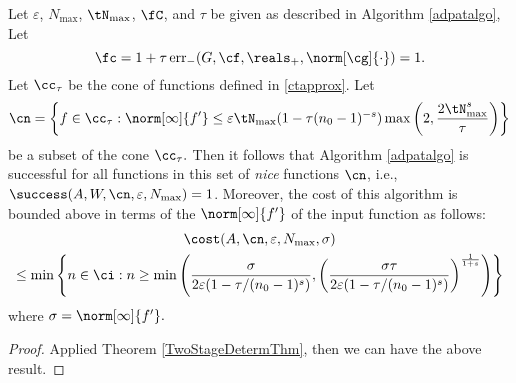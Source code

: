 \begin{theorem}   Let  $\varepsilon$, $N_{\max}$, $\tN_{\max}$, $\fC$, and $\tau$ be given as described in Algorithm \ref{adpatalgo},  Let
\begin{equation} \label{normdeflate}
\fc =1 + \tau \err_{-}(G,\cf,\reals_+,\norm[\cg]{\cdot}) =1.
\end{equation}
Let $\cc_\tau$ be the cone of functions defined in \eqref{ctapprox}.  Let
\begin{equation} \label{nicefdef}
\cn = \left \{ f \in \cc_\tau : \norm[\infty]{f'} \le \varepsilon \tN_{\max}(1 - \tau (n_0-1)^{-s}) \max\left( 2, \frac{2\tN_{\max}^{s}}{\tau} \right ) \right\}
\end{equation}
be a subset of the cone $\cc_\tau.$  Then it follows that Algorithm \ref{adpatalgo} is successful for all functions in this set of \emph{nice} functions $\cn$,  i.e.,  $\success(A,W,\cn,\varepsilon,N_{\max}) = 1$.  Moreover, the cost of this algorithm is bounded above in terms of the $\norm[\infty]{f'}$ of the input function as follows:
\begin{multline} \label{auto2stagedetcost}
\cost(A,\cn,\varepsilon,N_{\max},\sigma) \\
\le  \min\left\{ n \in \ci : n \ge \min\left( \frac{\sigma}{2\varepsilon(1 - \tau/(n_{0}-1)^{s})} , \left(\frac{\sigma\tau}{2\varepsilon(1 - \tau/(n_{0}-1)^{s})}\right)^{\frac{1}{1+s}}\right)  \right\}
\end{multline} where $\sigma=\norm[\infty]{f'}.$

\end{theorem}

\begin{proof}
Applied Theorem \ref{TwoStageDetermThm}, then we can have the above result.
\end{proof}

